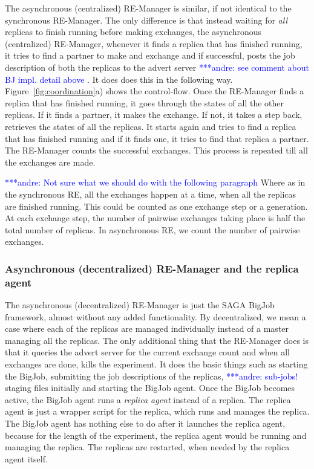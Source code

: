 \documentclass{rspublic}
\newcommand{\alnote}[1]{ {\textcolor{blue} { ***andre: #1 }}}
\newcommand{\alnote}[1]{}
\begin{document}
The asynchronous (centralized) RE-Manager is similar, if not identical to 
the synchronous RE-Manager. The only difference is that instead waiting 
for \emph{all} replicas to finish running before making exchanges, the 
asynchronous (centralized) RE-Manager, whenever it finds a replica that 
has finished running, it tries to find a partner to make and exchange 
and if successful, posts the job description of both the replicas to 
the advert server \alnote{see comment about BJ impl. detail above}. 
It does does this in the following way. Figure~\ref{fig:coordination}a) 
shows the control-flow. Once the RE-Manager finds a replica that has 
finished running, it goes through the states of all the other replicas. 
If it finds a partner, it makes the exchange. If not, it takes a step back, 
retrieves the states of all the replicas. It starts again and tries to 
find a replica that has finished running and if it finds one, it tries 
to find that replica a partner. The RE-Manager counts the successful 
exchanges. This process is repeated till all the exchanges are made. 

\alnote{Not sure what we should do with the following paragraph}
Where as in the synchronous RE, all the exchanges happen at a time, when all the replicas are finished running. This could be counted as one exchange step or a generation. At each exchange step, the number of pairwise exchanges taking place is half the total number of replicas. In asynchronous RE, we count the number of pairwise exchanges. 

\subsubsection{Asynchronous (decentralized) RE-Manager and the replica agent}

The asynchronous (decentralized) RE-Manager is just the SAGA BigJob framework, almost without any added functionality. By decentralized, we mean a case where each of the replicas are managed individually instead of a master managing all the replicas. The only additional thing that the RE-Manager does is that it queries the advert server for the current exchange count and when all exchanges are done, kills the experiment. It does the basic things such as starting the BigJob, submitting the job descriptions of the replicas,\alnote{sub-jobs!} staging files initially and starting the BigJob agent. Once the BigJob becomes active, the BigJob agent runs a \emph{replica agent} instead of a replica. The replica agent is just a wrapper script for the replica, which runs and manages the replica. The BigJob agent has nothing else to do after it launches the replica agent, because for the length of the experiment, the replica agent would be running and managing the replica. The replicas are restarted, when needed by the replica agent itself. 
\end{document}
